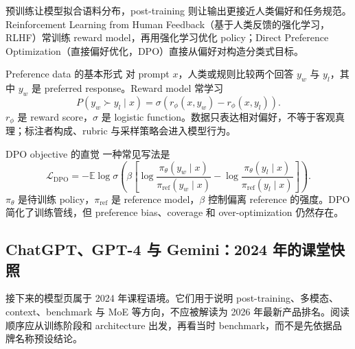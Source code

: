 预训练让模型拟合语料分布，post-training 则让输出更接近人类偏好和任务规范。Reinforcement Learning from Human Feedback（基于人类反馈的强化学习，RLHF）常训练 reward model，再用强化学习优化 policy；Direct Preference Optimization（直接偏好优化，DPO）直接从偏好对构造分类式目标。


\begin{importantbox}{Preference data 的基本形式}
对 prompt $x$，人类或规则比较两个回答 $y_w$ 与 $y_l$，其中 $y_w$ 是 preferred response。Reward model 常学习
\[
P(y_w\succ y_l\mid x)=\sigma\!\left(r_\phi(x,y_w)-r_\phi(x,y_l)\right).
\]
$r_\phi$ 是 reward score，$\sigma$ 是 logistic function。数据只表达相对偏好，不等于客观真理；标注者构成、rubric 与采样策略会进入模型行为。
\end{importantbox}


\begin{importantbox}{DPO objective 的直觉}
一种常见写法是
\[
\mathcal{L}_{\mathrm{DPO}}=-\mathbb{E}\log\sigma\!\left(\beta\left[
\log\frac{\pi_\theta(y_w\mid x)}{\pi_{\mathrm{ref}}(y_w\mid x)}-
\log\frac{\pi_\theta(y_l\mid x)}{\pi_{\mathrm{ref}}(y_l\mid x)}
\right]\right).
\]
$\pi_\theta$ 是待训练 policy，$\pi_{\mathrm{ref}}$ 是 reference model，$\beta$ 控制偏离 reference 的强度。DPO 简化了训练管线，但 preference bias、coverage 和 over-optimization 仍然存在。
\end{importantbox}


\subsection{ChatGPT、GPT-4 与 Gemini：2024 年的课堂快照}

接下来的模型页属于 2024 年课程语境。它们用于说明 post-training、多模态、context、benchmark 与 MoE 等方向，不应被解读为 2026 年最新产品排名。阅读顺序应从训练阶段和 architecture 出发，再看当时 benchmark，而不是先依据品牌名称预设结论。


